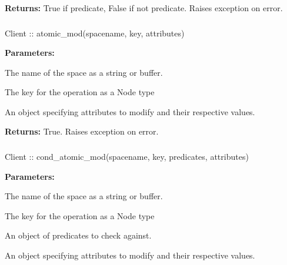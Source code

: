 \noindent\textbf{Returns:}
True if predicate, False if not predicate.  Raises exception on error.

\subsubsection{}
\label{api:nodejs:atomic_mod}
\begin{javascriptcode}
Client :: atomic_mod(spacename, key, attributes)
\end{javascriptcode}


\noindent\textbf{Parameters:}
\begin{description}[labelindent=\widthof{{\code{attributes}}},leftmargin=*,noitemsep,nolistsep,align=right]
\item[\code{spacename}] The name of the space as a string or buffer.
\item[\code{key}] The key for the operation as a Node type
\item[\code{attributes}] An object specifying attributes to modify and their respective values.
\end{description}

\noindent\textbf{Returns:}
True.  Raises exception on error.

\subsubsection{}
\label{api:nodejs:cond_atomic_mod}
\begin{javascriptcode}
Client :: cond_atomic_mod(spacename, key, predicates, attributes)
\end{javascriptcode}


\noindent\textbf{Parameters:}
\begin{description}[labelindent=\widthof{{\code{predicates}}},leftmargin=*,noitemsep,nolistsep,align=right]
\item[\code{spacename}] The name of the space as a string or buffer.
\item[\code{key}] The key for the operation as a Node type
\item[\code{predicates}] An object of predicates to check against.
\item[\code{attributes}] An object specifying attributes to modify and their respective values.
\end{description}

